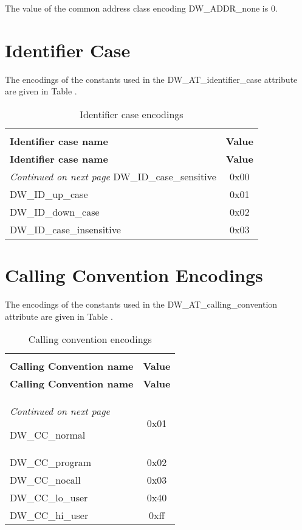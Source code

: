 The value of the common address class encoding 
DW\_ADDR\_none is 0.


\section{Identifier Case}
\label{datarep:identifiercase}

The encodings of the constants used in the 
DW\_AT\_identifier\_case attribute are given in 
Table .

\begin{centering}
\setlength{\extrarowheight}{0.1cm}
\begin{longtable}{l|c}
  \caption{Identifier case encodings} \label{tab:identifiercaseencodings}\\
  \hline \\ \bfseries Identifier case name&\bfseries Value \\ \hline
\endfirsthead
  \bfseries Identifier case name&\bfseries Value\\ \hline
\endhead
  \hline \emph{Continued on next page}
\endfoot
  \hline
\endlastfoot
DW\_ID\_case\_sensitive&0x00     \\
DW\_ID\_up\_case&0x01     \\
DW\_ID\_down\_case&0x02     \\
DW\_ID\_case\_insensitive&0x03     \\
\end{longtable}
\end{centering}

\section{Calling Convention Encodings}
\label{datarep:callingconventionencodings}
The encodings of the constants used in the 
DW\_AT\_calling\_convention attribute are given in
Table .

\begin{centering}
\setlength{\extrarowheight}{0.1cm}
\begin{longtable}{l|c}
  \caption{Calling convention encodings} \label{tab:callingconventionencodings}\\
  \hline \\ \bfseries Calling Convention name&\bfseries Value \\ \hline
\endfirsthead
  \bfseries Calling Convention name&\bfseries Value\\ \hline
\endhead
  \hline \emph{Continued on next page}
\endfoot
  \hline
\endlastfoot

DW\_CC\_normal&0x01     \\
DW\_CC\_program&0x02     \\
DW\_CC\_nocall&0x03     \\
DW\_CC\_lo\_user&0x40     \\
DW\_CC\_hi\_user&0xff     \\

\end{longtable}
\end{centering}

